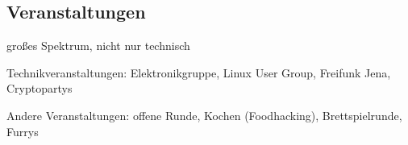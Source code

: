 \documentclass[a4paper,12pt,twoside]{scrartcl}
\begin{document}
\subsection*{Veranstaltungen}
\begin{compactitem}
\item großes Spektrum, nicht nur technisch
\item Technikveranstaltungen: Elektronikgruppe, Linux User Group, Freifunk Jena, Cryptopartys
\item Andere Veranstaltungen: offene Runde, Kochen (Foodhacking), Brettspielrunde,  Furrys
\end{compactitem}
\end{document}
